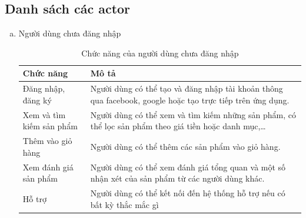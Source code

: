 \newpage
\subsection{Danh sách các actor}
\begin{enumerate}[a. ]
    \item Người dùng chưa đăng nhập\\
    \begin{table}[h]
    \centering
    \begin{tabular}{|p{5cm}|p{10cm}|}
        \hline
          Chức năng & Mô tả  \\
             \hline
             Đăng nhập, đăng ký & Người dùng có thể tạo và đăng nhập tài khoản thông qua facebook, google hoặc tạo trực tiếp trên ứng dụng.  \\
             \hline
             Xem và tìm kiếm sản phẩm& Người dùng có thể xem và tìm kiếm những sản phẩm, có thể lọc sản phẩm theo giá tiền hoặc danh mục,… \\
             \hline 
              Thêm vào giỏ hàng & Người dùng có thể thêm các sản phẩm vào giỏ hàng. \\
             \hline 
              Xem đánh giá sản phẩm & Người dùng có thể xem đánh giá tổng quan và một số nhận xét của sản phẩm từ các người dùng khác. \\
             \hline 
              Hỗ trợ & Người dùng có thể kết nối đến hệ thống hỗ trợ nếu có bất kỳ thắc mắc gì \\
             \hline 
        \end{tabular}
        \newline
        \caption{Chức năng của người dùng chưa đăng nhập}
        \end{table}
        

\end{enumerate}
